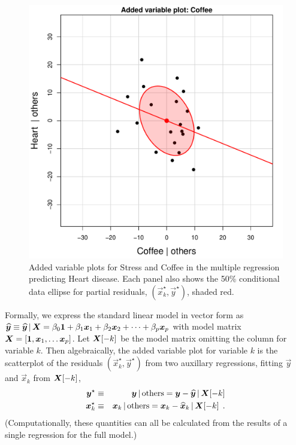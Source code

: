\begin{figure}[htb]
\begin{minipage}[b]{.49\linewidth}
  \includegraphics[width=1\linewidth]{fig/coffee-avplot2}
 \end{minipage}
  \caption{Added variable plots for Stress and Coffee in the multiple regression predicting Heart disease.
Each panel also shows the 50\% conditional data ellipse for partial residuals, $(\vec{x}_k^\star, \vec{y}^\star)$, shaded red. 
}
  \label{fig:coffee-avplot-A}
\end{figure}

Formally, we express the standard linear model in vector form as
$\widehat{\bm{y}} \equiv \widehat{\bm{y}} \, | \, \bm{X} = \beta_0 \bm{1} + \beta_1 \bm{x}_1 + \beta_2 \bm{x}_2 + \dots +  \beta_p \bm{x}_p$
with model matrix $\mat{X} = [ \vec{1}, \vec{x}_1, \dots \vec{x}_p ]$.
Let $\bm{X}[-k]$ be the model matrix omitting the column for variable $k$. 
Then algebraically, the added variable plot for variable $k$ is the scatterplot of the residuals $(\vec{x}^\star_k, \vec{y}^\star)$ from
two auxillary regressions, fitting $\vec{y}$ and $\vec{x}_k$ from $\bm{X}[-k]$,
\begin{eqnarray*}
 \bm{y}^\star   & \equiv & \bm{y} \, | \, \textrm{others}  =  \bm{y} - \widehat{\bm{y}} \, | \, \bm{X}[-k] \\
 \bm{x}^\star_k & \equiv & \bm{x}_k \, | \, \textrm{others}  =  \bm{x}_k - \widehat{\bm{x}}_k \, | \, \bm{X}[-k]  \:\: . \\
\end{eqnarray*}
(Computationally, these quantities can all be calculated \citep{VellemanWelsh:81} from the results of a single regression for the full model.)
 
